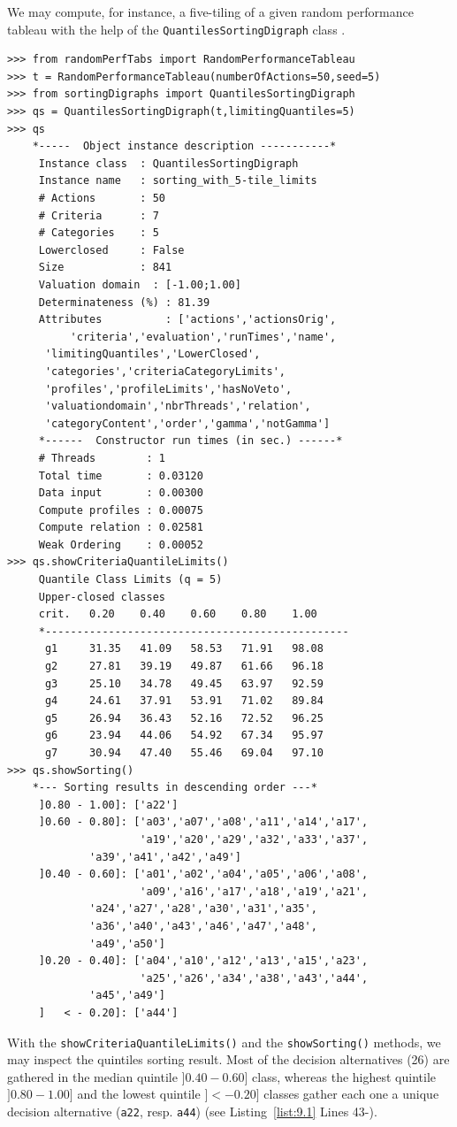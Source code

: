 We may compute, for instance, a five-tiling of a given random performance tableau with the help of the \texttt{QuantilesSortingDigraph} class .
\begin{lstlisting}[caption={Computing a quintiles sorting result},label=list:9.1]
>>> from randomPerfTabs import RandomPerformanceTableau
>>> t = RandomPerformanceTableau(numberOfActions=50,seed=5)
>>> from sortingDigraphs import QuantilesSortingDigraph
>>> qs = QuantilesSortingDigraph(t,limitingQuantiles=5)
>>> qs
    *-----  Object instance description -----------*
     Instance class  : QuantilesSortingDigraph
     Instance name   : sorting_with_5-tile_limits
     # Actions       : 50
     # Criteria      : 7
     # Categories    : 5
     Lowerclosed     : False
     Size            : 841
     Valuation domain  : [-1.00;1.00]
     Determinateness (%) : 81.39
     Attributes          : ['actions','actionsOrig',
          'criteria','evaluation','runTimes','name',
	  'limitingQuantiles','LowerClosed',
	  'categories','criteriaCategoryLimits',
	  'profiles','profileLimits','hasNoVeto',
	  'valuationdomain','nbrThreads','relation',
	  'categoryContent','order','gamma','notGamma']
     *------  Constructor run times (in sec.) ------*
     # Threads        : 1
     Total time       : 0.03120
     Data input       : 0.00300
     Compute profiles : 0.00075
     Compute relation : 0.02581
     Weak Ordering    : 0.00052
>>> qs.showCriteriaQuantileLimits()
     Quantile Class Limits (q = 5)
     Upper-closed classes
     crit.	 0.20	 0.40	 0.60	 0.80	 1.00	 
     *------------------------------------------------
      g1	 31.35	 41.09	 58.53	 71.91	 98.08	 
      g2	 27.81	 39.19	 49.87	 61.66	 96.18	 
      g3	 25.10	 34.78	 49.45	 63.97	 92.59	 
      g4	 24.61	 37.91	 53.91	 71.02	 89.84	 
      g5	 26.94	 36.43	 52.16	 72.52	 96.25	 
      g6	 23.94	 44.06	 54.92	 67.34	 95.97	 
      g7	 30.94	 47.40	 55.46	 69.04	 97.10	 
>>> qs.showSorting()
    *--- Sorting results in descending order ---*
     ]0.80 - 1.00]: ['a22']
     ]0.60 - 0.80]: ['a03','a07','a08','a11','a14','a17',
                     'a19','a20','a29','a32','a33','a37',
		     'a39','a41','a42','a49']
     ]0.40 - 0.60]: ['a01','a02','a04','a05','a06','a08',
                     'a09','a16','a17','a18','a19','a21',
		     'a24','a27','a28','a30','a31','a35',
		     'a36','a40','a43','a46','a47','a48',
		     'a49','a50']
     ]0.20 - 0.40]: ['a04','a10','a12','a13','a15','a23',
                     'a25','a26','a34','a38','a43','a44',
		     'a45','a49']
     ]   < - 0.20]: ['a44']
   \end{lstlisting}
With the \texttt{showCriteriaQuantileLimits()} and the \texttt{showSorting()} methods, we may inspect the quintiles sorting result. Most of the decision alternatives (26) are gathered in the median quintile $]0.40 - 0.60]$ class, whereas the highest quintile $]0.80-1.00]$ and the lowest quintile $]< - 0.20]$ classes gather each one a unique decision alternative (\texttt{a22}, resp. \texttt{a44}) (see Listing~\vref{list:9.1} Lines 43-).

